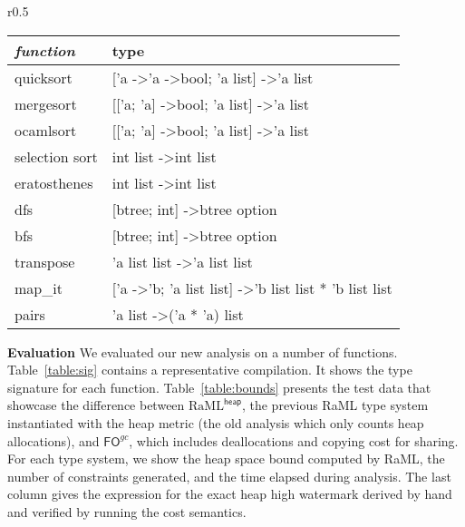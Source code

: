 \documentclass{easychair}
\newcommand{\ms}[1]{\ensuremath{\mathsf{#1}}}
\newcommand{\fogc}{\ms{FO}^{gc}}
\newcommand{\foheap}{\text{RaML}^{\ms{heap}}}
\theoremstyle{definition}
\begin{document}
\label{sect:evaluation}
\begin{wraptable}{r}{0.5\textwidth}
\small
	\vspace{-20pt}
		\begin{center}
	\begin{tabular}{ll}
		\hline
		\textit{\textbf{function}} & type \\ \hline
		quicksort & {[}'a -\textgreater 'a -\textgreater bool; 'a list{]} -\textgreater 'a list \\
		mergesort & {[}{[}'a; 'a{]} -\textgreater bool; 'a list{]} -\textgreater 'a list \\
		ocamlsort & {[}{[}'a; 'a{]} -\textgreater bool; 'a list{]} -\textgreater 'a list \\
		selection sort & int list -\textgreater int list \\
		eratosthenes & int list -\textgreater int list \\
		dfs & {[}btree; int{]} -\textgreater btree option \\
		bfs & {[}btree; int{]} -\textgreater btree option \\
		transpose & 'a list list -\textgreater 'a list list \\
		map\_it & {[}'a -\textgreater 'b; 'a list list{]} -\textgreater 'b list list * 'b list list\\
		pairs & 'a list -\textgreater ('a * 'a) list \\ \hline
	\end{tabular}
			\end{center}
				\vspace{-10pt}
			\caption{Signature of Test Functions}
		\vspace{-10pt}
\label{table:sig}
\end{wraptable}

\textbf{Evaluation}
We evaluated our new analysis on a number of functions. Table~\ref{table:sig} contains a representative compilation.
It shows the type signature for each function.
Table~\ref{table:bounds} presents the test data that
showcase the difference between $\foheap$, the previous RaML type system instantiated with the
heap metric (the old analysis which only counts 
heap allocations), and $\fogc$, which includes deallocations and copying cost for sharing.
For each type system, we show the heap space bound computed by RaML, 
the number of constraints generated, and the time elapsed during analysis. The last column gives
the expression for the exact heap high watermark derived by hand and verified by running the 
cost semantics.
\end{document}
